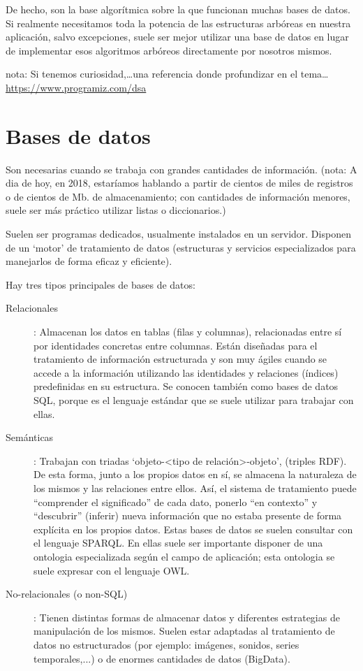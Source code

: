 \documentclass[spanish,12pt,a4paper,final,oneside]{book}
\begin{document}
De hecho, son la base algorítmica sobre la que funcionan muchas bases de datos. Si realmente necesitamos toda la potencia de las estructuras arbóreas en nuestra aplicación, salvo excepciones, suele ser mejor utilizar una base de datos en lugar de implementar esos algoritmos arbóreos directamente por nosotros mismos.

nota: Si tenemos curiosidad,\ldots una referencia donde profundizar en el tema\ldots \url{https://www.programiz.com/dsa}

\section{Bases de datos}
Son necesarias cuando se trabaja con grandes cantidades de información. (nota: A dia de hoy, en 2018, estaríamos hablando a partir de cientos de miles de registros o de cientos de Mb. de almacenamiento; con cantidades de información menores, suele ser más práctico utilizar listas o diccionarios.)

Suelen ser programas dedicados, usualmente instalados en un servidor.  Disponen de un ‘motor’ de tratamiento de datos (estructuras y servicios especializados para manejarlos de forma eficaz y eficiente).

Hay tres tipos principales de bases de datos:
\begin{description}

\item[Relacionales]: Almacenan los datos en tablas (filas y columnas), relacionadas entre sí por identidades concretas entre columnas. Están diseñadas para el tratamiento de información estructurada y son muy ágiles cuando se accede a la información utilizando las identidades y relaciones (índices) predefinidas en su estructura. Se conocen también como bases de datos SQL,  porque es el lenguaje estándar que se suele utilizar para trabajar con ellas.

\item[Semánticas]: Trabajan con triadas ‘objeto-<tipo de relación>-objeto’, (triples RDF). De esta forma, junto a los propios datos en sí, se almacena la naturaleza de los mismos y las relaciones entre ellos. Así, el sistema de tratamiento puede ``comprender el significado'' de cada dato, ponerlo ``en contexto'' y ``descubrir'' (inferir) nueva información que no estaba presente de forma explícita en los propios datos. Estas bases de datos se suelen consultar con el lenguaje SPARQL. En ellas suele ser importante disponer de una ontologia especializada según el campo de aplicación; esta ontologia se suele expresar con el lenguaje OWL.

\item[No-relacionales (o non-SQL)]: Tienen distintas formas de almacenar datos y diferentes estrategias de manipulación de los mismos. Suelen estar adaptadas al tratamiento de datos no estructurados (por ejemplo: imágenes, sonidos, series temporales,...) o de enormes cantidades de datos (BigData).

\end{description}
\end{document}
